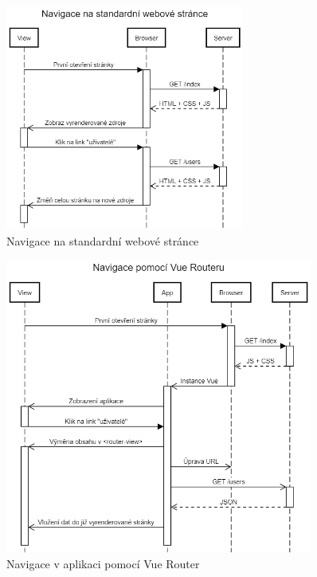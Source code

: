 \begin{figure}[]
\includegraphics[width=0.7\textwidth]{../png/diagrams/sequence-http-navigate.png}
\caption{Navigace na standardní webové stránce} \label{picture:route:http}
\end{figure}

\begin{figure}[]
\includegraphics[width=0.9\textwidth]{../png/diagrams/sequence-vue-router.png}
\caption{Navigace v aplikaci pomocí Vue Router} \label{picture:route:vue}
\end{figure}




